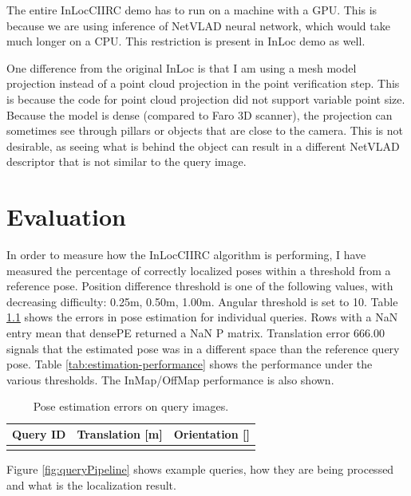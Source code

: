 \documentclass[twoside]{ctuthesis}
\theoremstyle{plain}
\theoremstyle{definition}
\theoremstyle{note}
\begin{document}
The entire InLocCIIRC demo has to run on a machine with a GPU. This is because we are using inference of NetVLAD neural network, which would take much longer on a CPU. This restriction is present in InLoc demo as well.

One difference from the original InLoc is that I am using a mesh model projection instead of a point cloud projection in the point verification step. This is because the code for point cloud projection did not support variable point size. Because the model is dense (compared to Faro 3D scanner), the projection can sometimes see through pillars or objects that are close to the camera. This is not desirable, as seeing what is behind the object can result in a different NetVLAD descriptor that is not similar to the query image.

\chapter{Evaluation}

In order to measure how the InLocCIIRC algorithm is performing, I have measured the percentage of correctly localized poses within a threshold from a reference pose. Position difference threshold is one of the following values, with decreasing difficulty: 0.25m, 0.50m, 1.00m. Angular threshold is set to 10\degree. Table \ref{tab:estimation-errors} shows the errors in pose estimation for individual queries. Rows with a NaN entry mean that densePE returned a NaN P matrix. Translation error $666.00$ signals that the estimated pose was in a different space than the reference query pose. Table \ref{tab:estimation-performance} shows the performance under the various thresholds. The InMap/OffMap performance is also shown.

\begin{table}
	\centering
	\begin{tabular}{|c|c|c|}
		\hline
		\bfseries Query ID & \bfseries Translation [m] & \bfseries Orientation [\degree]
		\csvreader[head to column names]{evaluation/errors.csv}{}
		{\\ \hline \id & \translation & \orientation}
		\\\hline
	\end{tabular}
	\caption{Pose estimation errors on query images.}
	\label{tab:estimation-errors}
\end{table}

Figure \ref{fig:queryPipeline} shows example queries, how they are being processed and what is the localization result.
\end{document}
